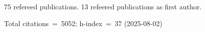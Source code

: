 75 refereed publications. 13 refeered publications as first author.

Total citations~=~5052; h-index~=~37 (2025-08-02)